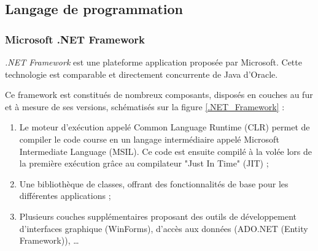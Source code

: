 
\subsection{Langage de programmation}


\subsubsection{Microsoft .NET Framework}

\textit{.NET Framework} est une plateforme application proposée par Microsoft. Cette technologie est comparable et directement concurrente de Java d'Oracle.

Ce framework est constitués de nombreux composants, disposés en couches au fur et à mesure de ses versions, schématisés sur la figure \ref{.NET_Framework} :
\begin{enumerate}
	\item Le moteur d'exécution appelé Common Language Runtime (CLR) permet de compiler le code course en un langage intermédiaire appelé Microsoft Intermediate Language (MSIL). Ce code est ensuite compilé à la volée lors de la première exécution grâce au compilateur "Just In Time" (JIT) ;
	\item Une bibliothèque de classes, offrant des fonctionnalités de base pour les différentes applications ;
	\item Plusieurs couches supplémentaires proposant des outils de développement d'interfaces graphique (WinForms), d'accès aux données (ADO.NET (Entity Framework)), \ldots
\end{enumerate}

